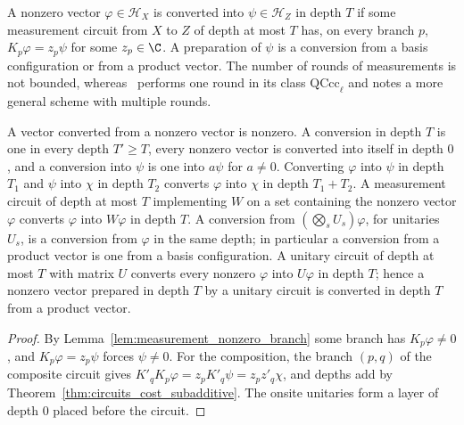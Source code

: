 \begin{definition}
    \label{def:measurement_conversion}
    \leanok
    A nonzero vector $\varphi\in\mathcal H_X$ is converted into $\psi\in\mathcal H_Z$ in depth
    $T$ if some measurement circuit from $X$ to $Z$ of depth at most $T$ has, on every branch
    $p$, $K_p\varphi=z_p\psi$ for some $z_p\in\C$. A preparation of $\psi$ is a conversion from
    a basis configuration or from a product vector. The number of rounds of measurements is not
    bounded, whereas~\cite{Piroli2021LOCC} performs one round in its class
    $\mathrm{QCcc}_\ell$ and notes a more general scheme with multiple rounds.
\end{definition}

\begin{theorem}
    \label{thm:measurement_conversion_comp}
    \leanok
    A vector converted from a nonzero vector is nonzero. A conversion in depth $T$ is one in
    every depth $T'\ge T$, every nonzero vector is converted into itself in depth $0$, and a
    conversion into $\psi$ is one into $a\psi$ for $a\neq0$. Converting $\varphi$ into $\psi$ in
    depth $T_1$ and $\psi$ into $\chi$ in depth $T_2$ converts $\varphi$ into $\chi$ in depth
    $T_1+T_2$. A measurement circuit of depth at most $T$ implementing $W$ on a set containing
    the nonzero vector $\varphi$ converts $\varphi$ into $W\varphi$ in depth $T$. A conversion
    from $(\bigotimes_sU_s)\varphi$, for unitaries $U_s$, is a conversion from $\varphi$ in the
    same depth; in particular a conversion from a product vector is one from a basis
    configuration. A unitary circuit of depth at most $T$ with matrix $U$ converts every
    nonzero $\varphi$ into $U\varphi$ in depth $T$; hence a nonzero vector prepared in depth $T$
    by a unitary circuit is converted in depth $T$ from a product vector.
\end{theorem}
\begin{proof}
    \leanok
    By Lemma~\ref{lem:measurement_nonzero_branch} some branch has $K_p\varphi\neq0$, and
    $K_p\varphi=z_p\psi$ forces $\psi\neq0$. For the composition, the branch $(p,q)$ of the
    composite circuit gives $K'_qK_p\varphi=z_pK'_q\psi=z_pz'_q\chi$, and depths add by
    Theorem~\ref{thm:circuits_cost_subadditive}. The onsite unitaries form a layer of depth
    $0$ placed before the circuit.
\end{proof}

